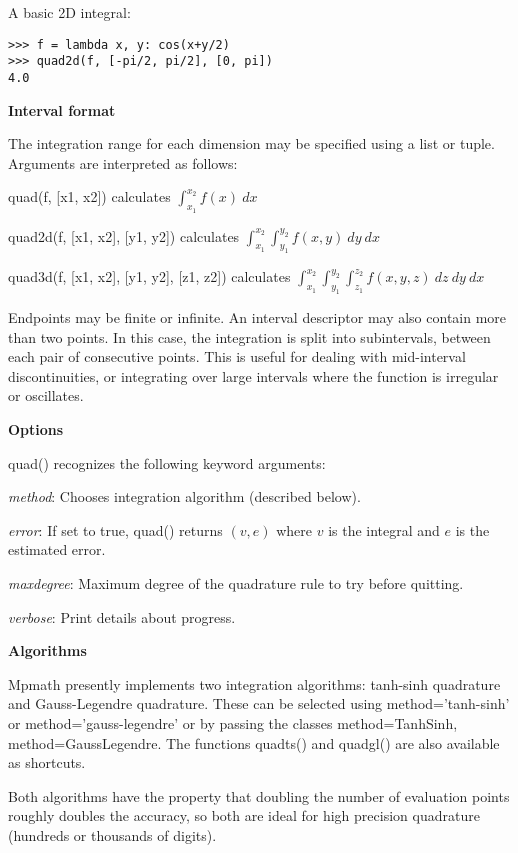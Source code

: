 A basic 2D integral:

\begin{lstlisting}
>>> f = lambda x, y: cos(x+y/2)
>>> quad2d(f, [-pi/2, pi/2], [0, pi])
4.0
\end{lstlisting}

\vpara
\textbf{Interval format}

The integration range for each dimension may be specified using a list or tuple. Arguments are interpreted as follows:

\vpara
quad(f, [x1, x2]) calculates $\int_{x_1}^{x_2} f(x)\: dx$

\vpara
quad2d(f, [x1, x2], [y1, y2])  calculates $\int_{x_1}^{x_2}  \int_{y_1}^{y_2} f(x,y) \: dy \: dx$


\vpara
quad3d(f, [x1, x2], [y1, y2], [z1, z2])  calculates $\int_{x_1}^{x_2}  \int_{y_1}^{y_2} \int_{z_1}^{z_2} f(x,y,z)\: dz \: dy \: dx$

\vpara
Endpoints may be finite or infinite. An interval descriptor may also contain more than two points. In this case, the integration is split into subintervals, between each pair of consecutive points. This is useful for dealing with mid-interval discontinuities, or
integrating over large intervals where the function is irregular or oscillates.

\vpara
\textbf{Options}

quad() recognizes the following keyword arguments:

\vpara
\textit{method}: Chooses integration algorithm (described below).

\vpara
\textit{error}: If set to true, quad() returns $(v,e)$ where $v$ is the integral and $e$ is the estimated error.

\vpara
\textit{maxdegree}: Maximum degree of the quadrature rule to try before quitting.

\vpara
\textit{verbose}: Print details about progress.

\vpara
\textbf{Algorithms}

Mpmath presently implements two integration algorithms: tanh-sinh quadrature and Gauss-Legendre quadrature. These can be selected using method='tanh-sinh' or method='gauss-legendre' or by passing the classes method=TanhSinh, method=GaussLegendre. The functions quadts() and quadgl() are also available as shortcuts.

\vpara
Both algorithms have the property that doubling the number of evaluation points roughly doubles the accuracy, so both are ideal for high precision quadrature (hundreds or thousands of digits).

